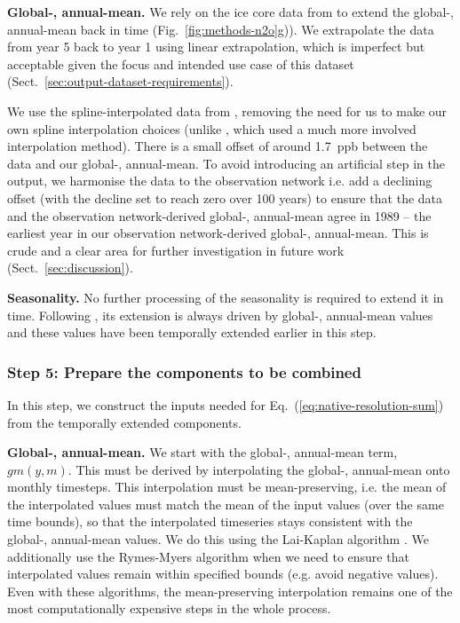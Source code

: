 \textbf{Global-, annual-mean.}
We rely on the ice core data from \citet{menking_law-dome_2025} to extend the global-, annual-mean back in time
(Fig.~\ref{fig:methods-n2o}g)).
We extrapolate the \citet{menking_law-dome_2025} data from year 5 back to year 1 using linear extrapolation,
which is imperfect but acceptable given the focus and intended use case of this dataset (Sect.~\ref{sec:output-dataset-requirements}).

We use the spline-interpolated data from \citet{menking_law-dome_2025},
removing the need for us to make our own spline interpolation choices
(unlike \citet{meinshausen_historical-ghgs_2017}, which used a much more involved interpolation method).
There is a small offset of around 1.7~ppb between the \citet{menking_law-dome_2025} data
and our global-, annual-mean.
To avoid introducing an artificial step in the output,
we harmonise the \citet{menking_law-dome_2025} data to the observation network
i.e. add a declining offset (with the decline set to reach zero over 100 years)
to ensure that the \citet{menking_law-dome_2025} data and the observation network-derived
global-, annual-mean agree in 1989 -- the earliest year in our observation network-derived global-, annual-mean.
This is crude and a clear area for further investigation in future work (Sect.~\ref{sec:discussion}).

\textbf{Seasonality.}
No further processing of the seasonality is required to extend it in time.
Following \cite{meinshausen_historical-ghgs_2017},
its extension is always driven by global-, annual-mean values
and these values have been temporally extended earlier in this step.

\subsubsection{Step 5: Prepare the components to be combined}
\label{sssec:methods-n2o-prepare-components}

In this step, we construct the inputs needed for Eq.~(\ref{eq:native-resolution-sum})
from the temporally extended components.

\textbf{Global-, annual-mean.}
We start with the global-, annual-mean term, $gm(y, m)$.
This must be derived by interpolating the global-, annual-mean onto monthly timesteps.
This interpolation must be mean-preserving,
i.e. the mean of the interpolated values must match the mean of the input values (over the same time bounds),
so that the interpolated timeseries stays consistent with the global-, annual-mean values.
We do this using the Lai-Kaplan algorithm \citep{lai-kaplan_algorithm_2022}.
We additionally use the Rymes-Myers algorithm \citep{rymes-myers_algorithm_2001}
when we need to ensure that interpolated values remain within specified bounds
(e.g. avoid negative values).
Even with these algorithms,
the mean-preserving interpolation remains one of the most computationally expensive steps in the whole process.

